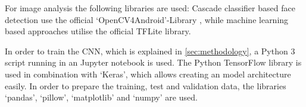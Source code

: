 For image analysis the following libraries are used: Cascade classifier based
face detection use the official `OpenCV4Android'-Library \cite{opencv4android},
while machine learning based approaches utilise the official TFLite library.
\cite{tensorflow}

In order to train the CNN, which is explained in \ref{sec:methodology}, a
Python 3 script running in an Jupyter notebook is used. 
The Python TensorFlow library is used in combination with `Keras',
which allows creating an model architecture easily. In order to prepare the
training, test and validation data, the libraries `pandas', `pillow', 
`matplotlib' and `numpy' are used.
